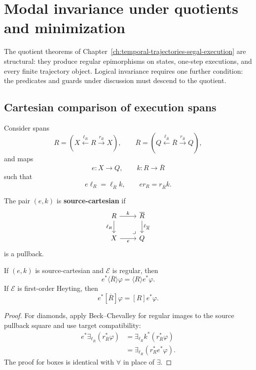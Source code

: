 \section{Modal invariance under quotients and minimization}
\label{sec:dynamic-modal-invariance-quotients}

The quotient theorems of
Chapter~\ref{ch:temporal-trajectories-segal-execution} are structural: they
produce regular epimorphisms on states, one-step executions, and every finite
trajectory object.  Logical invariance requires one further condition: the
predicates and guards under discussion must descend to the quotient.

\subsection{Cartesian comparison of execution spans}
\label{subsec:dynamic-cartesian-span-comparison}

Consider spans
\[
    R=
    \left(
    X\xleftarrow{\ell_R}R\xrightarrow{r_R}X
    \right),
    \qquad
    \overline R=
    \left(
    Q\xleftarrow{\ell_{\overline R}}\overline R
    \xrightarrow{r_{\overline R}}Q
    \right),
\]
and maps
\[
    e:X\to Q,
    \qquad
    k:R\to\overline R
\]
such that
\[
    e\ell_R=\ell_{\overline R}k,
    \qquad
    er_R=r_{\overline R}k.
\]

\begin{definition}
\label{def:dynamic-source-cartesian-span-comparison}
The pair \((e,k)\) is \textbf{source-cartesian} if
\[
\begin{tikzcd}
R \arrow[r,"k"] \arrow[d,"\ell_R"']
&
\overline R \arrow[d,"\ell_{\overline R}"]
\\
X \arrow[r,"e"']
&
Q
\arrow[ul,phantom,very near start,"\lrcorner"]
\end{tikzcd}
\]
is a pullback.
\end{definition}

\begin{proposition}
\label{prop:dynamic-modal-beck-chevalley-span-comparison}
If \((e,k)\) is source-cartesian and \(\mathcal E\) is regular, then
\[
    e^\ast\langle\overline R\rangle\varphi
    =
    \langle R\rangle e^\ast\varphi.
\]
If \(\mathcal E\) is first-order Heyting, then
\[
    e^\ast[\overline R]\varphi
    =
    [R]e^\ast\varphi.
\]
\end{proposition}

\begin{proof}
For diamonds, apply Beck--Chevalley for regular images to the source
pullback square and use target compatibility:
\[
\begin{aligned}
e^\ast\exists_{\ell_{\overline R}}
    (r_{\overline R}^\ast\varphi)
&=
\exists_{\ell_R}
    k^\ast(r_{\overline R}^\ast\varphi)\\
&=
\exists_{\ell_R}
    (r_R^\ast e^\ast\varphi).
\end{aligned}
\]
The proof for boxes is identical with \(\forall\) in place of \(\exists\).
\end{proof}


